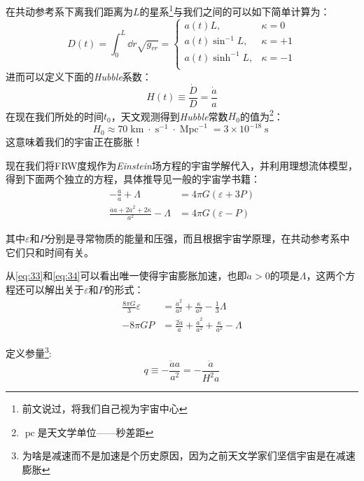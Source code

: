 \documentclass{ctexart}
\newcommand{\dotemph}[1]{\CJKunderdot{#1}}
\begin{document}
	在共动参考系下离我们距离为$L$的星系\footnote{前文说过，将我们自己视为宇宙中心}与我们之间的\dotemph{固有距离}可以如下简单计算为：
	\begin{equation}
		D(t)=\int_0^L\dd r\sqrt{g_{rr}}=\begin{cases}
			a(t)L,&\kappa=0\\
			a(t)\sin^{-1}L,&\kappa=+1\\
			a(t)\sinh^{-1}L,&\kappa=-1\\
		\end{cases}
	\end{equation}
	进而可以定义下面的\textit{Hubble}系数：
	\begin{equation}
		H(t)\equiv\frac{\dot{D}}{D}=\frac{\dot{a}}{a}
	\end{equation}
	在现在我们所处的时间$t_0$，天文观测得到\textit{Hubble}常数$H_0$的值为\footnote{$\operatorname{pc}$是天文学单位——秒差距}：
	\begin{equation}
		H_0\approx 70\operatorname{km}\cdot\operatorname{s}^{-1}\cdot\operatorname{Mpc}^{-1}=3\times10^{-18}\operatorname{s}
	\end{equation}
	这意味着我们的宇宙正在膨胀！
	
	现在我们将FRW度规作为\textit{Einstein}场方程的宇宙学解代入，并利用理想流体模型，得到下面两个独立的方程，具体推导见一般的宇宙学书籍：
	\begin{align}
		\label{eq:33} -\frac{\ddot{a}}{a}+\Lambda&=4\pi G\left(\varepsilon+3P\right)\\
		\label{eq:34} \frac{\ddot{a}a+2\dot{a}^2+2\kappa}{a^2}-\Lambda&=4\pi G\left(\varepsilon-P\right)
	\end{align}
	
	其中$\varepsilon$和$P$分别是寻常物质的能量和压强，而且根据宇宙学原理，在共动参考系中它们只和时间有关。
	
	从\ref{eq:33}和\ref{eq:34}可以看出唯一使得宇宙膨胀加速，也即$\ddot{a}>0$的项是$\Lambda$，这两个方程还可以解出关于$\varepsilon$和$P$的形式：
	\begin{align}
		\frac{8\pi G}{3}\varepsilon&=\frac{\dot a ^2}{a^2}+\frac{\kappa}{a^2}-\frac{1}{3}\Lambda\\
		\label{eq:36}-8\pi G P&=\frac{2\ddot{a}}{a}+\frac{\dot{a}^2}{a^2}+\frac{\kappa}{a^2}-\Lambda
	\end{align}

	定义\dotemph{减速}参量\footnote{为啥是减速而不是加速是个历史原因，因为之前天文学家们坚信宇宙是在减速膨胀}:
	\begin{equation}
		q\equiv -\frac{\ddot a a}{a^2}=-\frac{\ddot a}{H^2 a}
	\end{equation}
\end{document}
